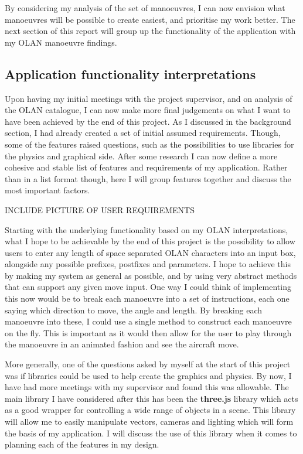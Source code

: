By considering my analysis of the set of manoeuvres, I can now envision what manoeuvres will be possible to create easiest, and prioritise my work better. The next section of this report will group up the functionality of the application with my OLAN manoeuvre findings.

\subsection{Application functionality interpretations}
Upon having my initial meetings with the project supervisor, and on analysis of the OLAN catalogue, I can now make more final judgements on what I want to have been achieved by the end of this project. As I discussed in the background section, I had already created a set of initial assumed requirements. Though, some of the features raised questions, such as the possibilities to use libraries for the physics and graphical side. After some research I can now define a more cohesive and stable list of features and requirements of my application. Rather than in a list format though, here I will group features together and discuss the most important factors.

INCLUDE PICTURE OF USER REQUIREMENTS

Starting with the underlying functionality based on my OLAN interpretations, what I hope to be achievable by the end of this project is the possibility to allow users to enter any length of space separated OLAN characters into an input box, alongside any possible prefixes, postfixes and parameters. I hope to achieve this by making my system as general as possible, and by using very abstract methods that can support any given move input. One way I could think of implementing this now would be to break each manoeuvre into a set of instructions, each one saying which direction to move, the angle and length. By breaking each manoeuvre into these, I could use a single method to construct each manoeuvre on the fly. This is important as it would then allow for the user to play through the manoeuvre in an animated fashion and see the aircraft move.

More generally, one of the questions asked by myself at the start of this project was if libraries could be used to help create the graphics and physics. By now, I have had more meetings with my supervisor and found this was allowable. The main library I have considered after this has been the \textbf{three.js} library which acts as a good wrapper for controlling a wide range of objects in a scene. This library will allow me to easily manipulate vectors, cameras and lighting which will form the basis of my application. I will discuss the use of this library when it comes to planning each of the features in my design.

